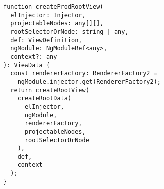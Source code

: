 \begin{verbatim}
function createProdRootView(
  elInjector: Injector,
  projectableNodes: any[][],
  rootSelectorOrNode: string | any,
  def: ViewDefinition,
  ngModule: NgModuleRef<any>,
  context?: any
): ViewData {
  const rendererFactory: RendererFactory2 =
    ngModule.injector.get(RendererFactory2);
  return createRootView(
    createRootData(
      elInjector,
      ngModule,
      rendererFactory,
      projectableNodes,
      rootSelectorOrNode
    ),
    def,
    context
  );
}
\end{verbatim}

